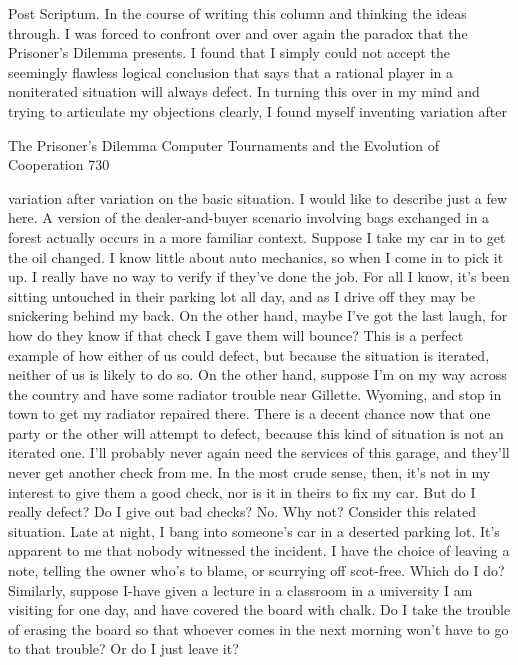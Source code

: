        Post Scriptum.
        In the course of writing this column and thinking the ideas through. I was forced
to confront over and over again the paradox that the Prisoner's Dilemma presents. I found
that I simply could not accept the seemingly flawless logical conclusion that says that a
rational player in a noniterated situation will always defect. In turning this over in my
mind and trying to articulate my objections clearly, I found myself inventing variation
after




The Prisoner's Dilemma Computer Tournaments and the Evolution of Cooperation           730

variation after variation on the basic situation. I would like to describe just a few here.
         A version of the dealer-and-buyer scenario involving bags exchanged in a forest
actually occurs in a more familiar context. Suppose I take my car in to get the oil
changed. I know little about auto mechanics, so when I come in to pick it up. I really
have no way to verify if they've done the job. For all I know, it's been sitting untouched
in their parking lot all day, and as I drive off they may be snickering behind my back. On
the other hand, maybe I've got the last laugh, for how do they know if that check I gave
them will bounce?
         This is a perfect example of how either of us could defect, but because the
situation is iterated, neither of us is likely to do so. On the other hand, suppose I'm on my
way across the country and have some radiator trouble near Gillette. Wyoming, and stop
in town to get my radiator repaired there. There is a decent chance now that one party or
the other will attempt to defect, because this kind of situation is not an iterated one. I'll
probably never again need the services of this garage, and they'll never get another check
from me. In the most crude sense, then, it's not in my interest to give them a good check,
nor is it in theirs to fix my car. But do I really defect? Do I give out bad checks? No. Why
not?
         Consider this related situation. Late at night, I bang into someone's car in a
deserted parking lot. It's apparent to me that nobody witnessed the incident. I have the
choice of leaving a note, telling the owner who's to blame, or scurrying off scot-free.
Which do I do? Similarly, suppose I-have given a lecture in a classroom in a university I
am visiting for one day, and have covered the board with chalk. Do I take the trouble of
erasing the board so that whoever comes in the next morning won't have to go to that
trouble? Or do I just leave it?


